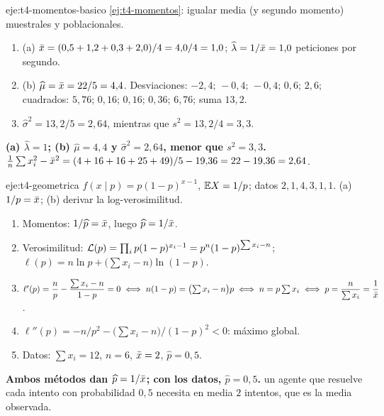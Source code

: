 \begin{solucion}{eje:t4-momentos-basico}
\planteamiento \cref{ej:t4-momentos}: igualar media (y segundo momento) muestrales y poblacionales.
\pasos
\begin{enumerate}[label=\arabic*.]
  \item (a) $\bar{x}=(0{,}5+1{,}2+0{,}3+2{,}0)/4=4{,}0/4=1{,}0$; $\widehat\lambda=1/\bar{x}=1{,}0$ peticiones por segundo.
  \item (b) $\widehat\mu=\bar{x}=22/5=4{,}4$. Desviaciones: $-2{,}4;\allowbreak\,-0{,}4;\allowbreak\,-0{,}4;\allowbreak\,0{,}6;\allowbreak\,2{,}6$; cuadrados: $5{,}76;\allowbreak\,0{,}16;\allowbreak\,0{,}16;\allowbreak\,0{,}36;\allowbreak\,6{,}76$; suma $13{,}2$.
  \item $\widehat\sigma^{2}=13{,}2/5=2{,}64$, mientras que $s^{2}=13{,}2/4=3{,}3$.
\end{enumerate}
\resultado \textbf{(a) $\widehat\lambda=1$; (b) $\widehat\mu=4{,}4$ y $\widehat\sigma^{2}=2{,}64$, menor que $s^{2}=3{,}3$.}
\comprobacion $\frac1n\sum x_i^{2}-\bar{x}^{2}=(4+16+16+25+49)/5-19{,}36=22-19{,}36=2{,}64$.
\end{solucion}

\begin{solucion}{eje:t4-geometrica}
\datos $f(x\mid p)=p(1-p)^{x-1}$, $\mathbb{E} X=1/p$; datos $2,1,4,3,1,1$.
\planteamiento (a) $1/p=\bar{x}$; (b) derivar la log-verosimilitud.
\pasos
\begin{enumerate}[label=\arabic*.]
  \item Momentos: $1/\widehat p=\bar{x}$, luego $\widehat p=1/\bar{x}$.
  \item Verosimilitud: $\mathcal{L}(p)=\prod_ip(1-p)^{x_i-1}=p^{n}(1-p)^{\sum x_i-n}$; $\ell(p)=n\ln p+\bigl(\sum x_i-n\bigr)\ln(1-p)$.
  \item $\ell'(p)=\dfrac np-\dfrac{\sum x_i-n}{1-p}=0\iff n(1-p)=\bigl(\sum x_i-n\bigr)p\iff n=p\sum x_i\iff p=\dfrac{n}{\sum x_i}=\dfrac1{\bar{x}}$.
  \item $\ell''(p)=-n/p^{2}-\bigl(\sum x_i-n\bigr)/(1-p)^{2}<0$: máximo global.
  \item Datos: $\sum x_i=12$, $n=6$, $\bar{x}=2$, $\widehat p=0{,}5$.
\end{enumerate}
\resultado \textbf{Ambos métodos dan $\widehat p=1/\bar{x}$; con los datos, $\widehat p=0{,}5$.}
\comprobacion un agente que resuelve cada intento con probabilidad $0{,}5$ necesita en media $2$ intentos, que es la media observada.
\end{solucion}

